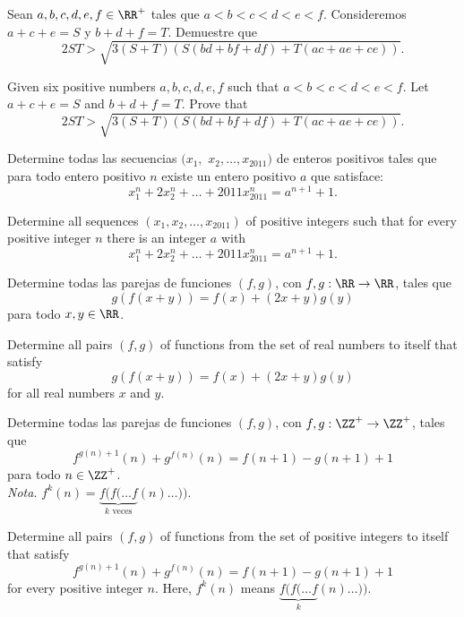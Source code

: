\begin{probMR}[ISL 2010/A8]
	Sean $a,b,c,d,e,f\in\RR^+$ tales que $a<b<c<d<e<f$. Consideremos $a+c+e=S$ y $b+d+f=T$. Demuestre que
	\[2ST>\sqrt{3(S+T)\left(S(bd+bf+df)+T(ac+ae+ce)\right)}.\]
	\begin{hint}
		Given six positive numbers $a,b,c,d,e,f$ such that $a<b<c<d<e<f$. Let $a+c+e=S$ and $b+d+f=T$. Prove that
		\[2ST>\sqrt{3(S+T)\left(S(bd+bf+df)+T(ac+ae+ce)\right)}.\]
	\end{hint}
\end{probMR}

\begin{probEG}[ISL 2011/A2]
	Determine todas las secuencias $(x_1,$ $x_2,\dots,x_{2011})$ de enteros positivos tales que para todo entero positivo $n$ existe un entero positivo $a$ que satisface:
	\[x_1^n+2x_2^n+\dots+2011x_{2011}^n=a^{n+1}+1.\]
	\begin{hint}
		Determine all sequences $(x_1,x_2,\dots,x_{2011})$ of positive integers such that for every positive integer $n$ there is an integer $a$ with
		\[x_1^n+2x_2^n+\dots+2011x_{2011}^n=a^{n+1}+1.\]
	\end{hint}
\end{probEG}

\begin{probMG}[ISL 2011/A3]
	Determine todas las parejas de funciones $(f,g)$, con $f,g:\RR\to\RR$, tales que
	\[g(f(x+y))=f(x)+(2x+y)g(y)\]
	para todo $x,y\in\RR$.
	\begin{hint}
		Determine all pairs $(f,g)$ of functions from the set of real numbers to itself that satisfy
		\[g(f(x+y))=f(x)+(2x+y)g(y)\]
		for all real numbers $x$ and $y$.
	\end{hint}
\end{probMG}

\begin{problem}[ISL 2011/A4]
	Determine todas las parejas de funciones $(f,g)$, con $f,g:\ZZ^+\to\ZZ^+$, tales que
	\[f^{g(n)+1}(n)+g^{f(n)}(n)=f(n+1)-g(n+1)+1\]
	para todo $n\in\ZZ^+$.\\[4pt]
	\emph{Nota.} $f^k(n)=\underbrace{f(f(\dots f}_{k\text{ veces}}(n)\dots))$.
	\begin{hint}
		Determine all pairs $(f,g)$ of functions from the set of positive integers to itself that satisfy
		\[f^{g(n)+1}(n)+g^{f(n)}(n)=f(n+1)-g(n+1)+1\]
		for every positive integer $n$. Here, $f^k(n)$ means $\underbrace{f(f(\dots f}_k(n)\dots))$.
	\end{hint}
\end{problem}

